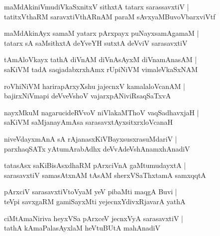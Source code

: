 \begin{shloka}
maMdAkiniVmudiVkaSxnitxV sithxtA tatarx sarassavxtiV |\\
tatitxVthaRM saravxtiVthARnAM paraM sAvxyaMBuvoVbarxviVtf 
\end{shloka}

\begin{shloka}
maMdAkinAyx samaM yatarx pArxpayx puNayxsamAgamaM |\\
tatarx sA saMsithxtA deYveYH sutxtA deVviV sarasavxtiV 
\end{shloka}

\begin{shloka}
tAmAloVkayx tathA diVnAM diVnAsAyxM diVnamAnasAM |\\
saKiVM tadA saqjadabxrxhAmx rUpiNiVM vimaleVkaSxNAM 
\end{shloka}

\begin{shloka}
roVhiNiVM harirapArxyXshu jajecnxV kamalaloVcanAM |\\
bajirxNiVmapi deVveVshoV vajarxpANiviRsaqSaTxvA\R
\end{shloka}

\begin{shloka}
nayxMkuM nagarucideRVvoV niVlakaMThoV vaqSadhavxjaH |\\
saKiVM saMjanayAmAsa sarasavxtAyxsitxrxloVcanaH
\end{shloka}

\begin{shloka}
niveVdayxmAnA sA rAjanasxKiVBayxsusxrasuMdariV |\\
parxhaqSATx yAtumArabAdhx deVvAdeVshAnamxhAnadiV 
\end{shloka}

\begin{shloka}
tatasAsx saKiBisAsxdhaRM pArxciVnA gaMtumudayxtA |\\
sarasavxtiV samasAtxnAM tAsAM sherxVSaThxtamA samxqqtA
\end{shloka}

\begin{shloka}
pArxciV sarasavxtiVtoVyaM yeV pibaMti maqgA Buvi |\\
teVpi savxgaRM gamiSayxMti yejecnxYdivxRjavarA yathA
\end{shloka}

\begin{shloka}
ciMtAmaNiriva heyxVSa pArxceV jecnxVyA sarasavxtiV |\\
tathA kAmaPalasAyxlaM heVtuBUtA mahAnadiV 
\end{shloka}


